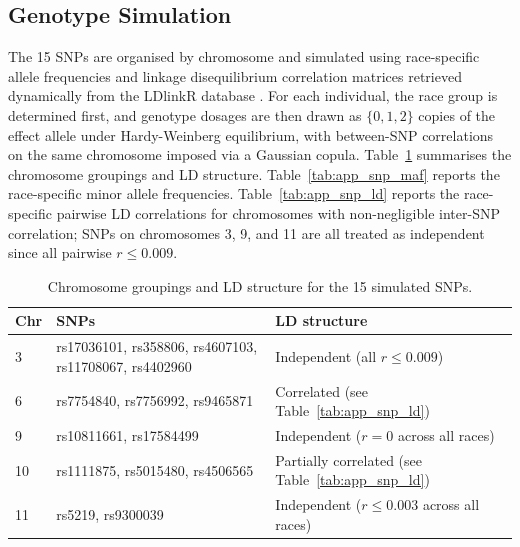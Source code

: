 \subsection{Genotype Simulation}
\label{app:sim2_geno}

The 15 SNPs are organised by chromosome and simulated using race-specific allele frequencies and linkage disequilibrium correlation matrices retrieved dynamically from the LDlinkR database \citep{Machiela2015}. For each individual, the race group is determined first, and genotype dosages are then drawn as $\{0, 1, 2\}$ copies of the effect allele under Hardy-Weinberg equilibrium, with between-SNP correlations on the same chromosome imposed via a Gaussian copula. Table~\ref{tab:app_snp_overview} summarises the chromosome groupings and LD structure. Table~\ref{tab:app_snp_maf} reports the race-specific minor allele frequencies. Table~\ref{tab:app_snp_ld} reports the race-specific pairwise LD correlations for chromosomes with non-negligible inter-SNP correlation; SNPs on chromosomes 3, 9, and 11 are all treated as independent since all pairwise $r \leq 0.009$.

\begin{table}[ht]
\centering
\caption{Chromosome groupings and LD structure for the 15 simulated SNPs.}
\label{tab:app_snp_overview}
\small
\begin{tabularx}{\textwidth}{l>{\raggedright\arraybackslash}X>{\raggedright\arraybackslash}X}
\hline
\textbf{Chr} & \textbf{SNPs} & \textbf{LD structure} \\
\hline
3  & rs17036101, rs358806, rs4607103, rs11708067, rs4402960
   & Independent (all $r \leq 0.009$) \\
6  & rs7754840, rs7756992, rs9465871
   & Correlated (see Table~\ref{tab:app_snp_ld}) \\
9  & rs10811661, rs17584499
   & Independent ($r = 0$ across all races) \\
10 & rs1111875, rs5015480, rs4506565
   & Partially correlated (see Table~\ref{tab:app_snp_ld}) \\
11 & rs5219, rs9300039
   & Independent ($r \leq 0.003$ across all races) \\
\hline
\end{tabularx}
\end{table}


